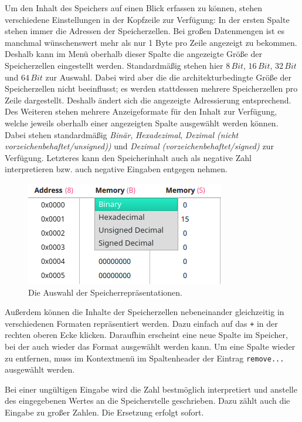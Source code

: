 Um den Inhalt des Speichers auf einen Blick erfassen zu können, stehen
verschiedene Einstellungen in der Kopfzeile zur Verfügung: In der ersten
Spalte stehen immer die Adressen der Speicherzellen. Bei großen Datenmengen ist
es manchmal wünschenswert mehr als nur 1 Byte pro Zeile angezeigt zu bekommen.
Deshalb kann im Menü oberhalb dieser Spalte die angezeigte Größe der
Speicherzellen eingestellt werden. Standardmäßig stehen hier $8\, Bit$, $16\,
Bit$, $32\, Bit$ und $64\, Bit$ zur Auswahl. Dabei wird aber die die
architekturbedingte Größe der Speicherzellen nicht beeinflusst; es werden
stattdessen mehrere Speicherzellen pro Zeile dargestellt. Deshalb ändert sich
die angezeigte Adressierung entsprechend. Des Weiteren stehen mehrere
Anzeigeformate für den Inhalt zur Verfügung, welche jeweils oberhalb einer
angezeigten Spalte ausgewählt werden können. Dabei stehen standardmäßig
\emph{Binär}, \emph{Hexadezimal}, \emph{Dezimal (nicht
vorzeichenbehaftet/unsigned))} und \emph{Dezimal (vorzeichenbehaftet/signed)}
zur Verfügung. Letzteres kann den Speicherinhalt auch als negative Zahl
interpretieren bzw. auch negative Eingaben entgegen nehmen.

\begin{figure}[ht]
	\centering
  \includegraphics[scale=1]{Images/Memory_Representation}
	\caption{Die Auswahl der Speicherrepräsentationen.}
	\label{Memory_Respresentations}
\end{figure}

\pagebreak
Außerdem können die Inhalte der Speicherzellen nebeneinander gleichzeitig in
verschiedenen Formaten repräsentiert werden. Dazu einfach auf das \texttt{+} in
der rechten oberen Ecke klicken. Daraufhin erscheint eine neue Spalte im
Speicher, bei der auch wieder das Format ausgewählt werden kann. Um eine Spalte
wieder zu entfernen, muss im Kontextmenü im Spaltenheader der Eintrag
\texttt{remove...} ausgewählt werden.

\begin{warningblock}
Bei einer ungültigen Eingabe wird die Zahl bestmöglich interpretiert und
anstelle des eingegebenen Wertes an die Speicherstelle geschrieben. Dazu zählt
auch die Eingabe zu großer Zahlen. Die Ersetzung erfolgt sofort.
\end{warningblock}

